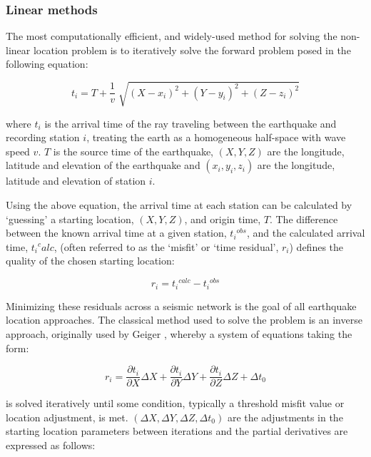 \subsubsection{Linear methods}\label{linloc}
The most computationally efficient, and widely-used method for solving the non-linear location problem is to iteratively solve the forward problem posed in the following equation:

\begin{equation}
t_i = T + \frac{1}{v}\sqrt[]{(X - x_i)^2 + (Y - y_i)^2 + (Z - z_i)^2}
\end{equation}

where $t_i$ is the arrival time of the ray traveling between the earthquake and recording station $i$, treating the earth as a homogeneous half-space with wave speed $v$. $T$ is the source time of the earthquake, $(X, Y, Z)$ are the longitude, latitude and elevation of the earthquake and $(x_i, y_i, z_i)$ are the longitude, latitude and elevation of station $i$.

Using the above equation, the arrival time at each station can be calculated by `guessing' a starting location, $(X, Y, Z)$, and origin time, $T$. The difference between the known arrival time at a given station, ${t_i}^{obs}$, and the calculated arrival time, ${t_i}^calc$, (often referred to as the `misfit' or `time residual', $r_i$) defines the quality of the chosen starting location:

\begin{equation}
r_i = {t_i}^{calc} - {t_i}^{obs}
\end{equation}

Minimizing these residuals across a seismic network is the goal of all earthquake location approaches. The classical method used to solve the problem is an inverse approach, originally used by Geiger \citep{l1910,geiger1912probability}, whereby a system of equations taking the form:

\begin{equation}
r_i = \frac{\partial{t_i}}{\partial{X}}\Delta{X} + \frac{\partial{t_i}}{\partial{Y}}\Delta{Y} + \frac{\partial{t_i}}{\partial{Z}}\Delta{Z} + \Delta{t_0}\label{eq:3}
\end{equation}

is solved iteratively until some condition, typically a threshold misfit value or location adjustment, is met. $(\Delta{X}, \Delta{Y}, \Delta{Z}, \Delta{t_0})$ are the adjustments in the starting location parameters between iterations and the partial derivatives are expressed as follows:

